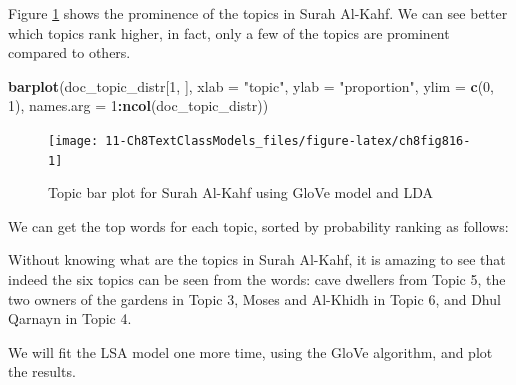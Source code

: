 \documentclass[
]{article}
\newenvironment{Shaded}{\begin{snugshade}}{\end{snugshade}}
\newcommand{\AttributeTok}[1]{\textcolor[rgb]{0.13,0.29,0.53}{#1}}
\newcommand{\DecValTok}[1]{\textcolor[rgb]{0.00,0.00,0.81}{#1}}
\newcommand{\FunctionTok}[1]{\textcolor[rgb]{0.13,0.29,0.53}{\textbf{#1}}}
\newcommand{\NormalTok}[1]{#1}
\newcommand{\SpecialCharTok}[1]{\textcolor[rgb]{0.81,0.36,0.00}{\textbf{#1}}}
\newcommand{\StringTok}[1]{\textcolor[rgb]{0.31,0.60,0.02}{#1}}
\begin{document}
\normalsize

Figure \ref{fig:ch8fig816} shows the prominence of the topics in Surah Al-Kahf. We can see better which topics rank higher, in fact, only a few of the topics are prominent compared to others.

\begin{Shaded}
\begin{Highlighting}[]
\FunctionTok{barplot}\NormalTok{(doc\_topic\_distr[}\DecValTok{1}\NormalTok{, ], }\AttributeTok{xlab =} \StringTok{"topic"}\NormalTok{, }
        \AttributeTok{ylab =} \StringTok{"proportion"}\NormalTok{, }\AttributeTok{ylim =} \FunctionTok{c}\NormalTok{(}\DecValTok{0}\NormalTok{, }\DecValTok{1}\NormalTok{), }
        \AttributeTok{names.arg =} \DecValTok{1}\SpecialCharTok{:}\FunctionTok{ncol}\NormalTok{(doc\_topic\_distr))}
\end{Highlighting}
\end{Shaded}

\begin{figure}

{\centering \texttt{[image: 11-Ch8TextClassModels\_files/figure-latex/ch8fig816-1]} 

}

\caption{Topic bar plot for Surah Al-Kahf using GloVe model and LDA}\label{fig:ch8fig816}
\end{figure}

We can get the top words for each topic, sorted by probability ranking as follows:

\footnotesize

\begin{Shaded}
\end{Shaded}

\normalsize

Without knowing what are the topics in Surah Al-Kahf, it is amazing to see that indeed the six topics can be seen from the words: cave dwellers from Topic 5, the two owners of the gardens in Topic 3, Moses and Al-Khidh in Topic 6, and Dhul Qarnayn in Topic 4.

We will fit the LSA model one more time, using the GloVe algorithm, and plot the results.
\end{document}
